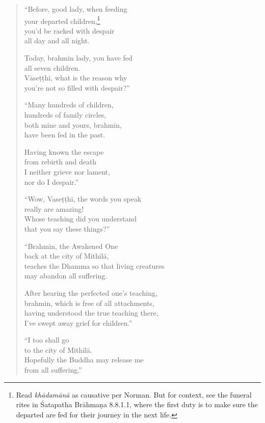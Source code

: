 \documentclass[12pt,openany]{book}%
\begin{document}
\begin{verse}%
“Before, good lady, when feeding \\
your departed children,\footnote{Read \textit{\textsanskrit{khādamānā}} as causative per Norman. But for context, see the funeral rites in Śatapatha \textsanskrit{Brāhmaṇa} 8.8.1.1, where the first duty is to make sure the departed are fed for their journey in the next life. } \\
you’d be racked with despair \\
all day and all night. 

Today, brahmin lady, you have fed \\
all seven children. \\
\textsanskrit{Vāseṭṭhī}, what is the reason why \\
you’re not so filled with despair?” 

“Many hundreds of children, \\
hundreds of family circles, \\
both mine and yours, brahmin, \\
have been fed in the past. 

Having known the escape \\
from rebirth and death \\
I neither grieve nor lament, \\
nor do I despair.” 

“Wow, \textsanskrit{Vaseṭṭhī}, the words you speak \\
really are amazing! \\
Whose teaching did you understand \\
that you say these things?” 

“Brahmin, the Awakened One \\
back at the city of \textsanskrit{Mithilā}, \\
teaches the Dhamma so that living creatures \\
may abandon all suffering. 

After hearing the perfected one’s teaching, \\
brahmin, which is free of all attachments, \\
having understood the true teaching there, \\
I’ve swept away grief for children.” 

“I too shall go \\
to the city of \textsanskrit{Mithilā}. \\
Hopefully the Buddha may release me \\
from all suffering.” 


\end{verse}
\end{document}
